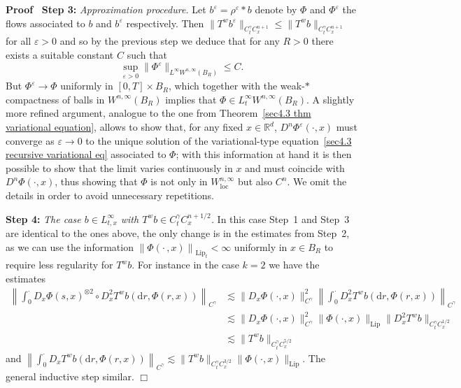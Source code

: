 \documentclass[10pt]{article}
\newcommand{\mathd}{\mathrm{d}}
\newcommand{\nobracket}{}
\newcommand{\tmop}[1]{\ensuremath{\operatorname{#1}}}
\newcommand{\tmstrong}[1]{\textbf{#1}}
\newcommand{\tmtextit}[1]{{\itshape{#1}}}
\newenvironment{proof}{\noindent\textbf{Proof\ }}{\hspace*{\fill}$\Box$\medskip}
\begin{document}
\begin{proof}
  {\tmstrong{Step 3:}} \tmtextit{Approximation procedure.} Let
  $b^{\varepsilon} = \rho^{\varepsilon} \ast b$ denote by $\Phi$ and
  $\Phi^{\varepsilon}$ the flows associated to $b$ and $b^{\varepsilon}$
  respectively. Then $\| T^w b^{\varepsilon} \|_{C^{\gamma}_t C^{n + 1}_x}
  \leqslant \| T^w b \|_{C^{\gamma}_t C^{n + 1}_x}$ for all $\varepsilon > 0$
  and so by the previous step we deduce that for any $R > 0$ there exists a
  suitable constant $C$ such that
  \[ \sup_{\varepsilon > 0}  \| \Phi^{\varepsilon} \|_{L^{\infty} W^{n,
     \infty} (B_R)} \leqslant C. \]
  But $\Phi^{\varepsilon} \rightarrow \Phi$ uniformly in $[0, T] \times B_R$,
  which together with the weak-$\ast$ compactness of balls in $W^{n, \infty}
  (B_R)$ implies that $\Phi \in L^{\infty}_t W^{n, \infty} (B_R)$. A slightly
  more refined argument, analogue to the one from Theorem~\ref{sec4.3 thm
  variational equation}, allows to show that, for any fixed $x \in
  \mathbb{R}^d$, $D^n \Phi^{\varepsilon} (\cdot, x)$ must converge as
  $\varepsilon \rightarrow 0$ to the unique solution of the variational-type
  equation~{\eqref{sec4.3 recursive variational eq}} associated to $\Phi$;
  with this information at hand it is then possible to show that the limit
  varies continuously in $x$ and must coincide with $D^n \Phi (\cdot, x)$,
  thus showing that $\Phi$ is not only in $W^{n, \infty}_{\tmop{loc}}$ but
  also $C^n$. We omit the details in order to avoid unnecessary repetitions.
  
  {\tmstrong{Step 4:}} \tmtextit{The case $b \in L^{\infty}_{t, x}$ with $T^w
  b \in C^{\gamma}_t C^{n + 1 / 2}_x$.} In this case Step~1 and Step~3 are
  identical to the ones above, the only change is in the estimates from
  Step~2, as we can use the information $\left\| \Phi \left( \cdot \,, x
  \right) \right\|_{\tmop{Lip}_t} < \infty$ uniformly in $x \in B_R$ to
  require less regularity for $T^w b$. For instance in the case $k = 2$ we
  have the estimates
  \[ \begin{array}{ll}
       \left\| \int_0^{\cdot} D_x \Phi (s, x)^{\otimes 2} \circ \nobracket
       D_x^2 T^w b (\mathd r, \Phi (r, x) \nobracket) \right\|_{C^{\gamma}} &
       \lesssim \| D_x \Phi (\cdot, x) \|_{C^{\gamma}}^2  \left\|
       \int_0^{\cdot} D_x^2 T^w b (\mathd r, \Phi (r, x))
       \right\|_{C^{\gamma}}\\
       & \lesssim \| D_x \Phi (\cdot, x) \|_{C^{\gamma}}^2  \| \Phi (\cdot,
       x) \|_{\tmop{Lip}}  \| D_x^2 T^w b \|_{C^{\gamma}_t C^{1 / 2}_x}\\
       & \lesssim \| T^w b \|_{C^{\gamma}_t C^{5 / 2}_x}
     \end{array} \]
  and $\left\| \int_0^{\cdot} D_x T^w b (\mathd r, \Phi (r, x))
  \right\|_{C^{\gamma}} \lesssim \| T^w b \|_{C^{\gamma}_t C^{3 / 2}_x}  \|
  \Phi (\cdot, x) \|_{\tmop{Lip}}$. The general inductive step similar.
\end{proof}
\end{document}
